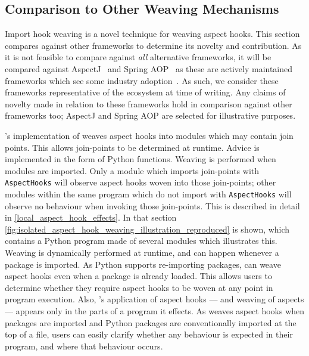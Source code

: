 \subsection{Comparison to Other Weaving Mechanisms}

Import hook weaving is a novel technique for weaving aspect hooks. This section
compares \pdsfthree against other \aop frameworks to determine its novelty and
contribution. As it is not feasible to compare \pdsfthree against \emph{all}
alternative \aop frameworks, it will be compared against
AspectJ~\cite{AspectJLanguageAndTools} and Spring
AOP~\cite{springAOPDocumentation} as these are actively maintained \aop
frameworks which see some industry adoption~\cite{przybylek2018empirical}. As
such, we consider these frameworks representative of the \aop ecosystem at time
of writing. Any claims of novelty made in relation to these frameworks hold in
comparison against other frameworks too; AspectJ and Spring AOP are selected for
illustrative purposes.

\pdsfthree{}'s implementation of \aop weaves aspect hooks into modules which may
contain join points. This allows join-points to be determined at runtime. Advice
is implemented in the form of Python functions. Weaving is performed when
modules are imported. Only a module which imports join-points with
\lstinline{AspectHooks} will observe aspect hooks woven into those join-points;
other modules within the same program which do not import with
\lstinline{AspectHooks} will observe no \aspectoriented behaviour when invoking
those join-points. This is described in detail in
\cref{local_aspect_hook_effects}. In that section
\cref{fig:isolated_aspect_hook_weaving_illustration_reproduced} is shown, which
contains a Python program made of several modules which illustrates this.
Weaving is dynamically performed at runtime, and can happen whenever a package
is imported. As Python supports re-importing packages, \pdsfthree can weave
aspect hooks even when a package is already loaded. This allows \pdsfthree users
to determine whether they require aspect hooks to be woven at any point in
program execution. Also, \pdsfthree{}'s application of aspect hooks --- and
weaving of aspects --- appears only in the parts of a program it effects. As
\pdsfthree weaves aspect hooks when packages are imported and Python packages
are conventionally imported at the top of a file, \pdsfthree users can easily
clarify whether any \aspectoriented behaviour is expected in their program, and
where that behaviour occurs.

